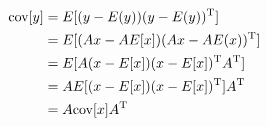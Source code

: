\documentclass{scrartcl}
\begin{document}
    \begin{align*}
        \textnormal{cov}[y] &= E[(y - E(y))(y - E(y))^\textnormal{T}]\\
        &= E[(Ax-AE[x])(Ax-AE(x))^\textnormal{T}]\\
        &= E[A(x-E[x])(x-E[x])^\textnormal{T}A^\textnormal{T}]\\
        &= AE[(x-E[x])(x-E[x])^\textnormal{T}]A^\textnormal{T}\\
        &= A\textnormal{cov}[x]A^\textnormal{T}
    \end{align*}
\end{document}

